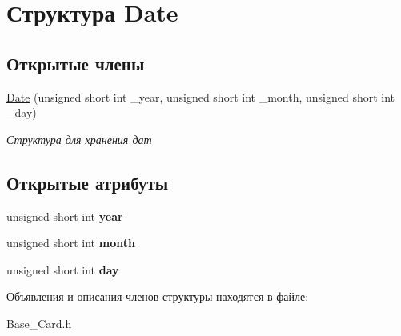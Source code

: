 \hypertarget{structDate}{}\section{Структура Date}
\label{structDate}
\subsection*{Открытые члены}
\begin{DoxyCompactItemize}
\item 
\hyperlink{structDate_a72f873b674793a6036722e4219963fe9}{Date} (unsigned short int \+\_\+year, unsigned short int \+\_\+month, unsigned short int \+\_\+day)\hypertarget{structDate_a72f873b674793a6036722e4219963fe9}{}\label{structDate_a72f873b674793a6036722e4219963fe9}

\begin{DoxyCompactList}\small\item\em Структура для хранения дат \end{DoxyCompactList}\end{DoxyCompactItemize}
\subsection*{Открытые атрибуты}
\begin{DoxyCompactItemize}
\item 
unsigned short int {\bfseries year}\hypertarget{structDate_a625fc77aaf532a67a936237450b1eb52}{}\label{structDate_a625fc77aaf532a67a936237450b1eb52}

\item 
unsigned short int {\bfseries month}\hypertarget{structDate_a458d17e9e98184a07c7c925e05a5c11c}{}\label{structDate_a458d17e9e98184a07c7c925e05a5c11c}

\item 
unsigned short int {\bfseries day}\hypertarget{structDate_a96d35542a5af9451533ad83c1ad8a273}{}\label{structDate_a96d35542a5af9451533ad83c1ad8a273}

\end{DoxyCompactItemize}


Объявления и описания членов структуры находятся в файле\+:\begin{DoxyCompactItemize}
\item 
Base\+\_\+\+Card.\+h\end{DoxyCompactItemize}
